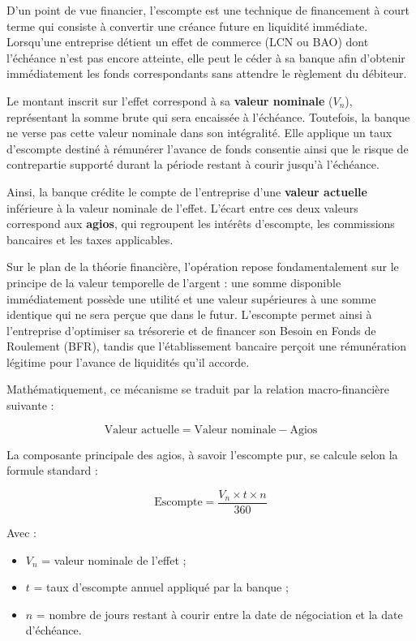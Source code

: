 \documentclass[12pt,a4paper]{report}
\begin{document}
D'un point de vue financier, l'escompte est une technique de financement à court terme qui consiste à convertir une créance future en liquidité immédiate. Lorsqu'une entreprise détient un effet de commerce (LCN ou BAO) dont l'échéance n'est pas encore atteinte, elle peut le céder à sa banque afin d'obtenir immédiatement les fonds correspondants sans attendre le règlement du débiteur.

Le montant inscrit sur l'effet correspond à sa \textbf{valeur nominale} ($V_n$), représentant la somme brute qui sera encaissée à l'échéance. Toutefois, la banque ne verse pas cette valeur nominale dans son intégralité. Elle applique un taux d'escompte destiné à rémunérer l'avance de fonds consentie ainsi que le risque de contrepartie supporté durant la période restant à courir jusqu'à l'échéance.

Ainsi, la banque crédite le compte de l'entreprise d'une \textbf{valeur actuelle} inférieure à la valeur nominale de l'effet. L'écart entre ces deux valeurs correspond aux \textbf{agios}, qui regroupent les intérêts d'escompte, les commissions bancaires et les taxes applicables.

Sur le plan de la théorie financière, l'opération repose fondamentalement sur le principe de la valeur temporelle de l'argent : une somme disponible immédiatement possède une utilité et une valeur supérieures à une somme identique qui ne sera perçue que dans le futur. L'escompte permet ainsi à l'entreprise d'optimiser sa trésorerie et de financer son Besoin en Fonds de Roulement (BFR), tandis que l'établissement bancaire perçoit une rémunération légitime pour l'avance de liquidités qu'il accorde.

Mathématiquement, ce mécanisme se traduit par la relation macro-financière suivante :

\begin{equation}
  \text{Valeur actuelle} = \text{Valeur nominale} - \text{Agios}
\end{equation}

La composante principale des agios, à savoir l'escompte pur, se calcule selon la formule standard :

\begin{equation}
  \text{Escompte} = \frac{V_n \times t \times n}{360}
\end{equation}

Avec :
\begin{itemize}
  \item $V_n$ = valeur nominale de l'effet ;
  \item $t$ = taux d'escompte annuel appliqué par la banque ;
  \item $n$ = nombre de jours restant à courir entre la date de négociation et la date d'échéance.
\end{itemize}
\end{document}
